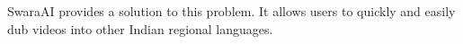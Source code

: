 \documentclass[preview]{standalone}
\begin{document}
\begin{flushleft}
\fontsize{20}{0}\selectfont SwaraAI provides a solution to this problem. It allows users to quickly and easily dub videos into other Indian regional languages.
\end{flushleft}
\end{document}
